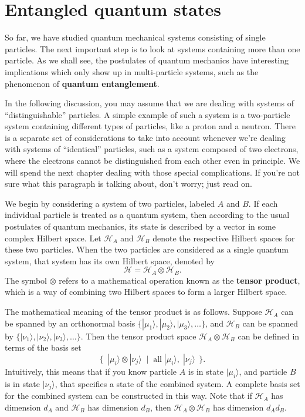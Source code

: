 \documentclass[pra,11pt]{revtex4}
\begin{document}
\section{Entangled quantum states}

So far, we have studied quantum mechanical systems consisting of
single particles.  The next important step is to look at systems
containing more than one particle.  As we shall see, the postulates of
quantum mechanics have interesting implications which only show up in
multi-particle systems, such as the phenomenon of \textbf{quantum
  entanglement}.

In the following discussion, you may assume that we are dealing with
systems of ``distinguishable'' particles.  A simple example of such a
system is a two-particle system containing different types of
particles, like a proton and a neutron.  There is a separate set of
considerations to take into account whenever we're dealing with
systems of ``identical'' particles, such as a system composed of two
electrons, where the electrons cannot be distinguished from each other
even in principle.  We will spend the next chapter dealing with those
special complications.  If you're not sure what this paragraph is
talking about, don't worry; just read on.

We begin by considering a system of two particles, labeled $A$ and
$B$.  If each individual particle is treated as a quantum system, then
according to the usual postulates of quantum mechanics, its state is
described by a vector in some complex Hilbert space.  Let
$\mathscr{H}_A$ and $\mathscr{H}_B$ denote the respective Hilbert
spaces for these two particles.  When the two particles are considered
as a single quantum system, that system has its own Hilbert space,
denoted by
$$\mathscr{H} = \mathscr{H}_A\otimes \mathscr{H}_B.$$
The symbol $\otimes$ refers to a mathematical operation known as the
\textbf{tensor product}, which is a way of combining two Hilbert
spaces to form a larger Hilbert space.

The mathematical meaning of the tensor product is as follows.  Suppose
$\mathscr{H}_A$ can be spanned by an orthonormal basis
$\{|\mu_1\rangle, |\mu_2\rangle, |\mu_3\rangle, \dots\}$, and
$\mathscr{H}_B$ can be spanned by $\{|\nu_1\rangle, |\nu_2\rangle,
|\nu_3\rangle, \dots\}$.  Then the tensor product space $\mathscr{H}_A
\otimes \mathscr{H}_B$ can be defined in terms of the basis set
$$\Big\{\;\,|\mu_i\rangle\otimes|\nu_j\rangle \;\;  \Big| \;\; \textrm{all}\;|\mu_i\rangle,\; |\nu_j\rangle \;\,\Big\}.$$
Intuitively, this means that if you know particle $A$ is in state
$|\mu_i\rangle$, and particle $B$ is in state $|\nu_j\rangle$, that
specifies a state of the combined system.  A complete basis set for
the combined system can be constructed in this way.  Note that if
$\mathscr{H}_A$ has dimension $d_A$ and $\mathscr{H}_B$ has dimension
$d_B$, then $\mathscr{H}_A \otimes \mathscr{H}_B$ has dimension $d_A
d_B$.
\end{document}
